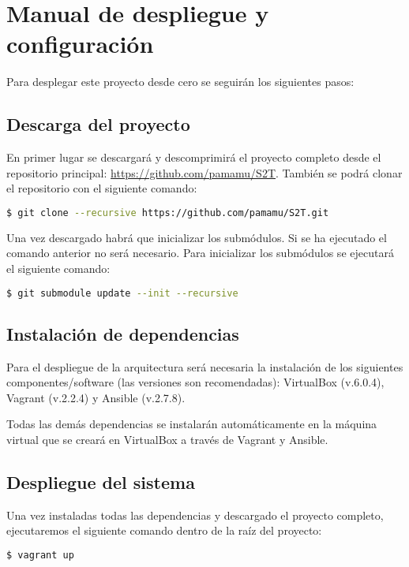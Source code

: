 \documentclass[../../main.tex]{subfiles}
\begin{document}
\chapter{Manual de despliegue y configuración}\label{ch:anexo_manual}
Para desplegar este proyecto desde cero se seguirán los siguientes pasos:
\section{Descarga del proyecto}
En primer lugar se descargará y descomprimirá el proyecto completo desde el repositorio principal: \href{https://github.com/pamamu/S2T}{https://github.com/pamamu/S2T}. También se podrá clonar el repositorio con el siguiente comando:

\begin{lstlisting}[language=bash]
  $ git clone --recursive https://github.com/pamamu/S2T.git
\end{lstlisting}

Una vez descargado habrá que inicializar los submódulos. Si se ha ejecutado el comando anterior no será necesario. Para inicializar los submódulos se ejecutará el siguiente comando:

\begin{lstlisting}[language=bash]
  $ git submodule update --init --recursive
\end{lstlisting}

\section{Instalación de dependencias}
Para el despliegue de la arquitectura será necesaria la instalación de los siguientes componentes/software (las versiones son recomendadas): VirtualBox (v.6.0.4), Vagrant (v.2.2.4) y Ansible (v.2.7.8).

Todas las demás dependencias se instalarán automáticamente en la máquina virtual que se creará en VirtualBox a través de Vagrant y Ansible.

\section{Despliegue del sistema}
Una vez instaladas todas las dependencias y descargado el proyecto completo, ejecutaremos el siguiente comando dentro de la raíz del proyecto:

\begin{lstlisting}[language=bash]
  $ vagrant up
\end{lstlisting}
\end{document}
